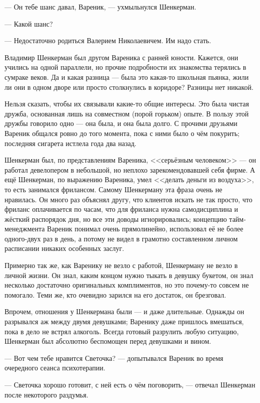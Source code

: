 --- Он тебе шанс давал, Вареник, --- ухмыльнулся Шенкерман.

--- Какой шанс?

--- Недостаточно родиться Валерием Николаевичем.
Им надо стать.

Владимир Шенкерман был другом Вареника с ранней юности.
Кажется, они учились на одной параллели, но прочие подробности их знакомства терялись в сумраке веков.
Да и какая разница --- была это какая-то школьная пьянка, жили ли они в одном дворе или просто столкнулись в коридоре?
Разницы нет никакой.

Нельзя сказать, чтобы их связывали какие-то общие интересы.
Это была чистая дружба, основанная лишь на совместном (порой горьком) опыте.
В пользу этой дружбы говорило одно --- она была, и она была долго.
С прочими друзьями Вареник общался ровно до того момента, пока с ними было о чём покурить;
последняя сигарета истлела года два назад.

Шенкерман был, по представлениям Вареника, <<серьёзным человеком>> --- он работал девелопером в небольшой, но неплохо зарекомендовавшей себя фирме.
А ещё Шенкерман, по выражению Вареника, умел <<делать деньги из воздуха>>, то есть занимался фрилансом.
Самому Шенкерману эта фраза очень не нравилась.
Он много раз объяснял другу, что клиентов искать не так просто, что фриланс оплачивается по часам, что для фриланса нужна самодисциплина и жёсткий распорядок дня, но все эти доводы игнорировались;
концепцию тайм-менеджмента Вареник понимал очень прямолинейно, использовал её не более одного-двух раз в день, а потому не видел в грамотно составленном личном расписании никаких особенных заслуг.

Примерно так же, как Варенику не везло с работой, Шенкерману не везло в личной жизни.
Он знал, каким концом нужно тыкать в девушку букетом, он знал несколько достаточно оригинальных комплиментов, но это почему-то совсем не помогало.
Теми же, кто очевидно зарился на его достаток, он брезговал.

Впрочем, отношения у Шенкермана были --- и даже длительные.
Однажды он разрывался аж между двумя девушками;
Варенику даже пришлось вмешаться, пока в дело не встрял алкоголь.
Всегда готовый разрулить любую ситуацию, Шенкерман был абсолютно беспомощен перед девушками и вином.

--- Вот чем тебе нравится Светочка? --- допытывался Вареник во время очередного сеанса психотерапии.

--- Светочка хорошо готовит, с ней есть о чём поговорить, --- отвечал Шенкерман после некоторого раздумья.

